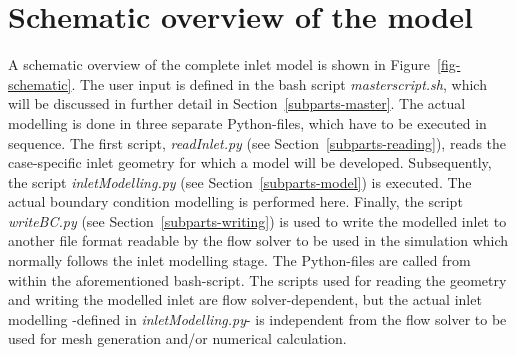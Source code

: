 \documentclass[fleqn,10pt,a4paper,twoside,english]{book}
\begin{document}

\newcommand{\tm}[1]{$\mbox{#1}^{\mbox{\emph{\scriptsize TM}}}$}

\baselineskip 13.0pt

\fancyhf[EH]{}
\fancyhf[OH]{}	
\fancyhf[OHR]{\rightmark}
\fancyhf[FC]{\thepage}
\fancyhf[EHL]{\rightmark}


\section{Schematic overview of the model\label{schematic}}
A schematic overview of the complete inlet model is shown in \mbox{Figure \ref{fig-schematic}}. The user input is defined in the bash script \textit{masterscript.sh}, which will be discussed in further detail in \mbox{Section \ref{subparts-master}}. The actual modelling is done in three separate Python-files, which have to be executed in sequence. The first script, \textit{readInlet.py} (see \mbox{Section \ref{subparts-reading})}, reads the case-specific inlet geometry for which a model will be developed. Subsequently, the script \textit{inletModelling.py} (see \mbox{Section \ref{subparts-model})} is executed. The actual boundary condition modelling is performed here. Finally, the script \textit{writeBC.py} (see \mbox{Section \ref{subparts-writing})} is used to write the modelled inlet to another file format readable by the flow solver to be used in the simulation which normally follows the inlet modelling stage. The Python-files are called from within the aforementioned bash-script. The scripts used for reading the geometry and writing the modelled inlet are flow solver-dependent, but the actual inlet modelling -defined in \textit{inletModelling.py}- is independent from the flow solver to be used for mesh generation and/or numerical calculation. 
\end{document}
